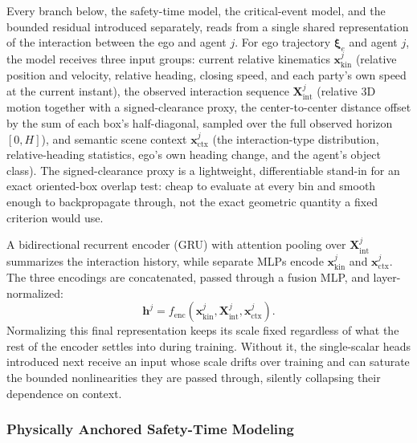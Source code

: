 \documentclass[letterpaper, 10 pt, conference]{ieeeconf}  %
\begin{document}
Every branch below, the safety-time model, the critical-event model, and
the bounded residual introduced separately, reads from a single shared
representation of the interaction between the ego and agent $j$. For ego
trajectory $\bm{\xi}_e$ and agent $j$, the model receives three input
groups: current relative kinematics $\bm{x}_{\mathrm{kin}}^{j}$ (relative
position and velocity, relative heading, closing speed, and each party's
own speed at the current instant), the observed interaction sequence
$\bm{X}_{\mathrm{int}}^{j}$ (relative 3D motion together with a
signed-clearance proxy, the center-to-center distance offset by the sum of
each box's half-diagonal, sampled over the full observed horizon
$[0,H]$), and semantic scene context $\bm{x}_{\mathrm{ctx}}^{j}$ (the
interaction-type distribution, relative-heading statistics, ego's own
heading change, and the agent's object class). The signed-clearance proxy
is a lightweight, differentiable stand-in for an exact oriented-box
overlap test: cheap to evaluate at every bin and smooth enough to
backpropagate through, not the exact geometric quantity a fixed criterion
would use.

A bidirectional recurrent encoder (GRU) with attention pooling
over $\bm{X}_{\mathrm{int}}^{j}$ summarizes the interaction history, while
separate MLPs encode $\bm{x}_{\mathrm{kin}}^{j}$ and
$\bm{x}_{\mathrm{ctx}}^{j}$. The three encodings are concatenated, passed
through a fusion MLP, and layer-normalized:
\begin{equation}
\bm h^{j}
=f_{\mathrm{enc}}\!\left(
\bm{x}_{\mathrm{kin}}^{j},
\bm{X}_{\mathrm{int}}^{j},
\bm{x}_{\mathrm{ctx}}^{j}
\right).
\label{eq:carm_encoder}
\end{equation}
Normalizing this final representation keeps its scale fixed regardless of
what the rest of the encoder settles into during training. Without it, the
single-scalar heads introduced next receive an input whose scale drifts
over training and can saturate the bounded nonlinearities they are passed
through, silently collapsing their dependence on context.

\subsubsection{Physically Anchored Safety-Time Modeling}
\end{document}
